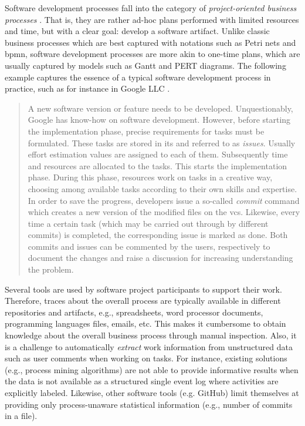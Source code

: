 Software development processes fall into the category of \emph{project-oriented business processes} \citep{DBLP:conf/bpm/BalaCMRP15}. 
That is, they are rather ad-hoc plans performed with limited resources and time, but with a clear goal: develop a software artifact. Unlike classic business processes which are best captured with notations such as Petri nets and \gls{bpmn}, software development processes are more akin to one-time plans, which are usually captured by models such as Gantt and PERT diagrams. The following example captures the essence of a typical software development process in practice, such as for instance in Google LLC \citep{Henderson2017}.


\begin{quote}
	A new software version or feature needs to be developed. Unquestionably, Google has know-how on software development. However, before starting the implementation phase, precise requirements for tasks must be formulated. These tasks are stored in \gls{its} and referred to as \emph{issues}. Usually effort estimation values are assigned to each of them. Subsequently time and resources are allocated to the tasks. This starts the implementation phase. During this phase, resources work on tasks in a creative way, choosing among available tasks according to their own skills and expertise. In order to save the progress, developers issue a so-called \emph{commit} command which creates a new version of the modified files on the \gls{vcs}. Likewise, every time a certain task (which may be carried out through by different commits) is completed, the corresponding issue is marked as done. Both commits and issues can be commented by the users, respectively to document the changes and raise a discussion for increasing understanding the problem.
\end{quote}

Several tools are used by software project participants to support their work. Therefore, traces about the overall process are typically available in different repositories and artifacts, e.g., spreadsheets, word processor documents, programming languages files, emails, etc. This makes it cumbersome to obtain knowledge about the overall business process through manual inspection. Also, it is a challenge to automatically \emph{extract} work information from unstructured data such as user comments when working on tasks. For instance, existing solutions (e.g., process mining algorithms) are not able to provide informative results when the data is not available as a structured single event log where activities are explicitly labeled. Likewise, other software tools (e.g. GitHub) limit themselves at providing only process-unaware statistical information (e.g., number of commits in a file).

